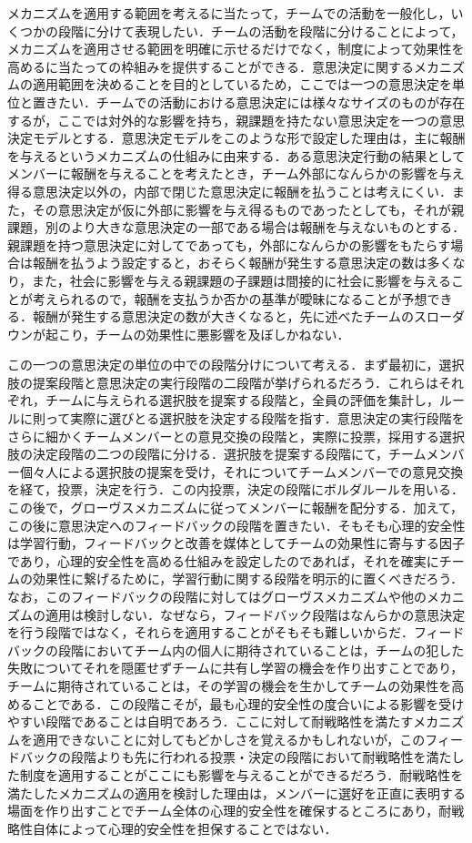 \documentclass[a4paper, 11pt]{jsarticle}
\begin{document}
メカニズムを適用する範囲を考えるに当たって，チームでの活動を一般化し，いくつかの段階に分けて表現したい．チームの活動を段階に分けることによって，メカニズムを適用させる範囲を明確に示せるだけでなく，制度によって効果性を高めるに当たっての枠組みを提供することができる．意思決定に関するメカニズムの適用範囲を決めることを目的としているため，ここでは一つの意思決定を単位と置きたい．チームでの活動における意思決定には様々なサイズのものが存在するが，ここでは対外的な影響を持ち，親課題を持たない意思決定を一つの意思決定モデルとする．意思決定モデルをこのような形で設定した理由は，主に報酬を与えるというメカニズムの仕組みに由来する．ある意思決定行動の結果としてメンバーに報酬を与えることを考えたとき，チーム外部になんらかの影響を与え得る意思決定以外の，内部で閉じた意思決定に報酬を払うことは考えにくい．また，その意思決定が仮に外部に影響を与え得るものであったとしても，それが親課題，別のより大きな意思決定の一部である場合は報酬を与えないものとする．親課題を持つ意思決定に対してであっても，外部になんらかの影響をもたらす場合は報酬を払うよう設定すると，おそらく報酬が発生する意思決定の数は多くなり，また，社会に影響を与える親課題の子課題は間接的に社会に影響を与えることが考えられるので，報酬を支払うか否かの基準が曖昧になることが予想できる．報酬が発生する意思決定の数が大きくなると，先に述べたチームのスローダウンが起こり，チームの効果性に悪影響を及ぼしかねない．

この一つの意思決定の単位の中での段階分けについて考える．まず最初に，選択肢の提案段階と意思決定の実行段階の二段階が挙げられるだろう．これらはそれぞれ，チームに与えられる選択肢を提案する段階と，全員の評価を集計し，ルールに則って実際に選びとる選択肢を決定する段階を指す．意思決定の実行段階をさらに細かくチームメンバーとの意見交換の段階と，実際に投票，採用する選択肢の決定段階の二つの段階に分ける．選択肢を提案する段階にて，チームメンバー個々人による選択肢の提案を受け，それについてチームメンバーでの意見交換を経て，投票，決定を行う．この内投票，決定の段階にボルダルールを用いる．この後で，グローヴスメカニズムに従ってメンバーに報酬を配分する．加えて，この後に意思決定へのフィードバックの段階を置きたい．そもそも心理的安全性は学習行動，フィードバックと改善を媒体としてチームの効果性に寄与する因子であり，心理的安全性を高める仕組みを設定したのであれば，それを確実にチームの効果性に繋げるために，学習行動に関する段階を明示的に置くべきだろう．なお，このフィードバックの段階に対してはグローヴスメカニズムや他のメカニズムの適用は検討しない．なぜなら，フィードバック段階はなんらかの意思決定を行う段階ではなく，それらを適用することがそもそも難しいからだ．フィードバックの段階においてチーム内の個人に期待されていることは，チームの犯した失敗についてそれを隠匿せずチームに共有し学習の機会を作り出すことであり，チームに期待されていることは，その学習の機会を生かしてチームの効果性を高めることである．この段階こそが，最も心理的安全性の度合いによる影響を受けやすい段階であることは自明であろう．ここに対して耐戦略性を満たすメカニズムを適用できないことに対してもどかしさを覚えるかもしれないが，このフィードバックの段階よりも先に行われる投票・決定の段階において耐戦略性を満たした制度を適用することがここにも影響を与えることができるだろう．耐戦略性を満たしたメカニズムの適用を検討した理由は，メンバーに選好を正直に表明する場面を作り出すことでチーム全体の心理的安全性を確保するところにあり，耐戦略性自体によって心理的安全性を担保することではない．
\end{document}
